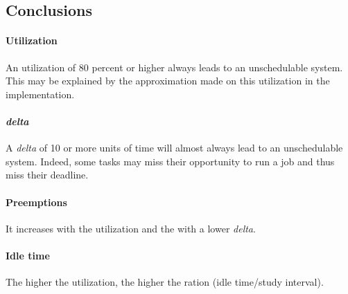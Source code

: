 \documentclass[a4paper,11pt]{article}
\begin{document}
	\subsection{Conclusions}
	\paragraph{Utilization} An utilization of 80 percent or higher always leads to an unschedulable system.
	This may be explained by the approximation made on this utilization in the implementation.

	\paragraph{\textit{delta}} A \textit{delta} of 10 or more units of time will almost always lead to an unschedulable system. Indeed, some tasks may miss their opportunity to run a job and thus miss their deadline.

	\paragraph{Preemptions} It increases with the utilization and the with a lower \textit{delta}.

	\paragraph{Idle time} The higher the utilization, the higher the ration (idle time/study interval).
     
     
    \clearpage
    \appendix
\end{document}
